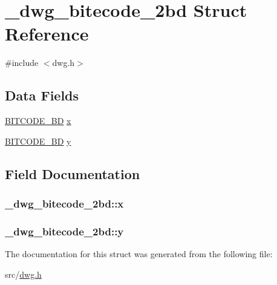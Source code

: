 \hypertarget{struct__dwg__bitecode__2bd}{\section{\-\_\-dwg\-\_\-bitecode\-\_\-2bd \-Struct \-Reference}
\label{struct__dwg__bitecode__2bd}
}


{\ttfamily \#include $<$dwg.\-h$>$}

\subsection*{\-Data \-Fields}
\begin{DoxyCompactItemize}
\item 
\hyperlink{dwg_8h_a3c1e6781466b74ba07785d57da70ed97}{\-B\-I\-T\-C\-O\-D\-E\-\_\-\-B\-D} \hyperlink{struct__dwg__bitecode__2bd_a974ff5b6e38e18d57dc366c6ec703305}{x}
\item 
\hyperlink{dwg_8h_a3c1e6781466b74ba07785d57da70ed97}{\-B\-I\-T\-C\-O\-D\-E\-\_\-\-B\-D} \hyperlink{struct__dwg__bitecode__2bd_ac458c334681be03a1495f564ffa634f8}{y}
\end{DoxyCompactItemize}


\subsection{\-Field \-Documentation}
\hypertarget{struct__dwg__bitecode__2bd_a974ff5b6e38e18d57dc366c6ec703305}{
\subsubsection[{x}]{ {\bf \-\_\-dwg\-\_\-bitecode\-\_\-2bd\-::x}}}\label{struct__dwg__bitecode__2bd_a974ff5b6e38e18d57dc366c6ec703305}
\hypertarget{struct__dwg__bitecode__2bd_ac458c334681be03a1495f564ffa634f8}{
\subsubsection[{y}]{ {\bf \-\_\-dwg\-\_\-bitecode\-\_\-2bd\-::y}}}\label{struct__dwg__bitecode__2bd_ac458c334681be03a1495f564ffa634f8}


\-The documentation for this struct was generated from the following file\-:\begin{DoxyCompactItemize}
\item 
src/\hyperlink{dwg_8h}{dwg.\-h}\end{DoxyCompactItemize}
